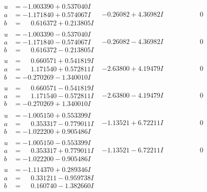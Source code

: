 \documentclass[1p]{elsarticle_modified}
\theoremstyle{definition}
\begin{document}
$$\begin{array}{c|c|c}
 \hline 
\begin{aligned}
u &= -1.003390 + 0.537040 I \\
a &= -1.171840 + 0.574067 I \\
b &= \phantom{-}0.616372 + 0.213805 I\end{aligned}
 & -0.26082 + 4.36982 I & \phantom{-0.000000 } 0 \\ \hline\begin{aligned}
u &= -1.003390 - 0.537040 I \\
a &= -1.171840 - 0.574067 I \\
b &= \phantom{-}0.616372 - 0.213805 I\end{aligned}
 & -0.26082 - 4.36982 I & \phantom{-0.000000 } 0 \\ \hline\begin{aligned}
u &= \phantom{-}0.660571 + 0.541819 I \\
a &= \phantom{-}1.171540 + 0.572811 I \\
b &= -0.270269 - 1.340010 I\end{aligned}
 & -2.63800 + 4.19479 I & \phantom{-0.000000 } 0 \\ \hline\begin{aligned}
u &= \phantom{-}0.660571 - 0.541819 I \\
a &= \phantom{-}1.171540 - 0.572811 I \\
b &= -0.270269 + 1.340010 I\end{aligned}
 & -2.63800 - 4.19479 I & \phantom{-0.000000 } 0 \\ \hline\begin{aligned}
u &= -1.005150 + 0.553399 I \\
a &= \phantom{-}0.353317 - 0.779011 I \\
b &= -1.022200 + 0.905486 I\end{aligned}
 & -1.13521 + 6.72211 I & \phantom{-0.000000 } 0 \\ \hline\begin{aligned}
u &= -1.005150 - 0.553399 I \\
a &= \phantom{-}0.353317 + 0.779011 I \\
b &= -1.022200 - 0.905486 I\end{aligned}
 & -1.13521 - 6.72211 I & \phantom{-0.000000 } 0 \\ \hline\begin{aligned}
u &= -1.114370 + 0.289346 I \\
a &= \phantom{-}0.331211 - 0.959738 I \\
b &= \phantom{-}0.160740 - 1.382660 I\end{aligned}

\end{array}$$
\end{document}
